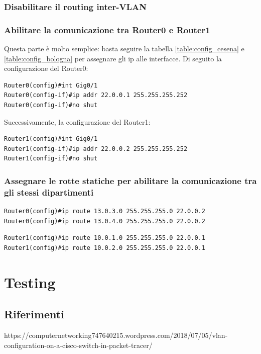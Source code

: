 \documentclass[a4paper,12pt]{report}
\begin{document}
\subsection{Disabilitare il routing inter-VLAN}
\subsection{Abilitare la comunicazione tra Router0 e Router1}
Questa parte è molto semplice: basta seguire la tabella \ref{table:config_cesena} e \ref{table:config_bologna} per assegnare gli ip alle interfacce.
Di seguito la configurazione del Router0:
\begin{verbatim}
Router0(config)#int Gig0/1
Router0(config-if)#ip addr 22.0.0.1 255.255.255.252
Router0(config-if)#no shut
\end{verbatim}
Successivamente, la configurazione del Router1:
\begin{verbatim}
Router1(config)#int Gig0/1
Router1(config-if)#ip addr 22.0.0.2 255.255.255.252
Router1(config-if)#no shut
\end{verbatim}
\subsection{Assegnare le rotte statiche per abilitare la  comunicazione tra gli stessi dipartimenti}
\begin{verbatim}
Router0(config)#ip route 13.0.3.0 255.255.255.0 22.0.0.2
Router0(config)#ip route 13.0.4.0 255.255.255.0 22.0.0.2
\end{verbatim}
\begin{verbatim}
Router1(config)#ip route 10.0.1.0 255.255.255.0 22.0.0.1
Router1(config)#ip route 10.0.2.0 255.255.255.0 22.0.0.1
\end{verbatim}
\chapter{Testing}
\label{chap:testing}
\section{Riferimenti}
https://computernetworking747640215.wordpress.com/2018/07/05/vlan-configuration-on-a-cisco-switch-in-packet-tracer/
%
\end{document}
